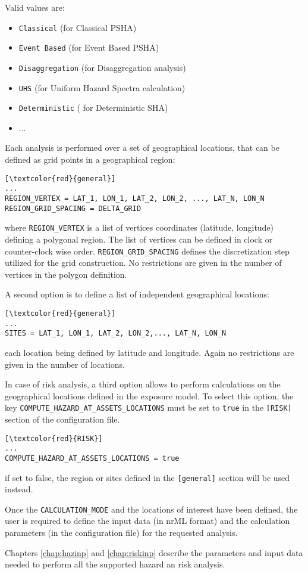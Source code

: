 Valid values are: 
\begin{itemize}
\item \Verb+Classical+ (for Classical PSHA)
\item \Verb+Event Based+ (for Event Based PSHA)
\item \Verb+Disaggregation+ (for Disaggregation analysis)
\item \Verb+UHS+ (for Uniform Hazard Spectra calculation)
\item \Verb+Deterministic+ ( for Deterministic SHA)
\item ...
\end{itemize}

Each analysis is performed over a set of geographical locations, that can be defined as grid points in a geographical region:

\begin{Verbatim}[frame=single, commandchars=\\\{\}, samepage=true]
[\textcolor{red}{general}]
...
REGION_VERTEX = LAT_1, LON_1, LAT_2, LON_2, ..., LAT_N, LON_N
REGION_GRID_SPACING = DELTA_GRID
\end{Verbatim}

where \Verb+REGION_VERTEX+ is a list of vertices coordinates (latitude, longitude) defining a polygonal region. The list of vertices can be defined in clock or counter-clock wise order. \Verb+REGION_GRID_SPACING+ defines the discretization step utilized for the grid construction. No restrictions are given in the number of vertices in the polygon definition.

A second option is to define a list of independent geographical locations:
\begin{Verbatim}[frame=single, commandchars=\\\{\}, samepage=true]
[\textcolor{red}{general}]
...
SITES = LAT_1, LON_1, LAT_2, LON_2,..., LAT_N, LON_N
\end{Verbatim}
each location being defined by latitude and longitude. Again no restrictions are given in the number of locations.

In case of risk analysis, a third option allows to perform calculations on the geographical locations defined in the exposure model. To select this option, the key \Verb+COMPUTE_HAZARD_AT_ASSETS_LOCATIONS+ must be set to \Verb+true+ in the \Verb+[RISK]+ section of the configuration file.
\begin{Verbatim}[frame=single, commandchars=\\\{\}, samepage=true]
[\textcolor{red}{RISK}]
...
COMPUTE_HAZARD_AT_ASSETS_LOCATIONS = true
\end{Verbatim}
if set to false, the region or sites defined in the \Verb+[general]+ section will be used instead.

Once the \Verb+CALCULATION_MODE+ and the locations of interest have been defined, the user is required to define the input data (in nrML format) and the calculation parameters (in the configuration file) for the requested analysis.

Chapters \ref{chap:hazinp} and \ref{chap:riskinp} describe the parameters and input data needed to perform all the supported hazard an risk analysis.